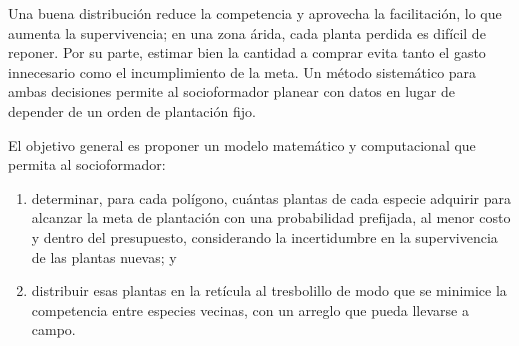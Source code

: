 Una buena distribución reduce la competencia y aprovecha la facilitación, lo que aumenta la supervivencia; en una zona árida, cada planta perdida es difícil de reponer. Por su parte, estimar bien la cantidad a comprar evita tanto el gasto innecesario como el incumplimiento de la meta. Un método sistemático para ambas decisiones permite al socioformador planear con datos en lugar de depender de un orden de plantación fijo.

El objetivo general es proponer un modelo matemático y computacional que permita al socioformador:
\begin{enumerate}
  \item determinar, para cada polígono, cuántas plantas de cada especie adquirir para alcanzar la meta de plantación con una probabilidad prefijada, al menor costo y dentro del presupuesto, considerando la incertidumbre en la supervivencia de las plantas nuevas; y
  \item distribuir esas plantas en la retícula al tresbolillo de modo que se minimice la competencia entre especies vecinas, con un arreglo que pueda llevarse a campo.
\end{enumerate}
